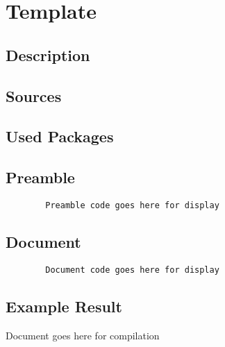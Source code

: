 \documentclass{article}
\begin{document}
	
	\section*{Template}
	
	\subsection*{Description}
	
	\subsection*{Sources}
	\sloppy
	\url{}
		
	\subsection*{Used Packages}
	\verb||
	
	\subsection*{Preamble}
	\begin{lstlisting}
		Preamble code goes here for display
	\end{lstlisting}
	
	\subsection*{Document}
	\begin{lstlisting}
		Document code goes here for display
	\end{lstlisting}
	
	\subsection*{Example Result}
		Document goes here for compilation
\end{document}
